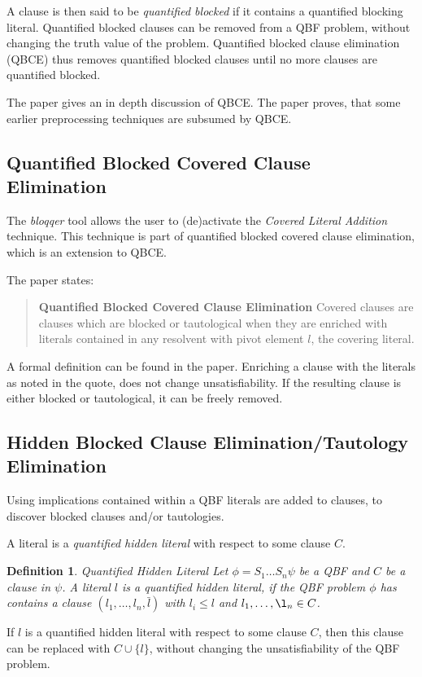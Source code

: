 \documentclass{scrartcl}
\newtheorem{definition}{Definition}
\begin{document}
A clause is then said to be \emph{quantified blocked} if it contains a
quantified blocking literal. Quantified blocked clauses can be removed from a
QBF problem, without changing the truth value of the problem. 
Quantified blocked clause elimination (QBCE) thus removes quantified blocked clauses
until no more clauses are quantified blocked. 

The paper gives an in depth discussion of QBCE. The paper proves, that some
earlier preprocessing techniques are subsumed by QBCE.

\subsection{Quantified Blocked Covered Clause Elimination}
The \emph{bloqqer} tool allows the user to (de)activate the \emph{Covered
Literal Addition} technique. This technique is part of quantified blocked
covered clause elimination, which is an extension to QBCE.

The paper states: 
\begin{quote}\textbf{Quantified Blocked Covered Clause Elimination}
Covered clauses are clauses which are blocked or tautological when they are
enriched with literals contained in any resolvent with pivot element $l$, the
covering literal.
\end{quote}
A formal definition can be found in the paper.
Enriching a clause with the literals as noted in the quote, does not change
unsatisfiability. If the resulting clause is either blocked or tautological, it
can be freely removed. 

\subsection{Hidden Blocked Clause Elimination/Tautology Elimination}

Using implications contained within a QBF literals are added to clauses, to
discover blocked clauses and/or tautologies.

A literal is a \emph{quantified hidden literal} with respect to some clause $C$.
\begin{definition}{Quantified Hidden Literal}
Let $\phi=S_1\dots S_n\psi$ be a QBF and $C$ be a clause in $\psi$. A literal
$l$ is a \emph{quantified hidden literal}, if the QBF problem $\phi$ has
contains a clause $(l_1,\dots,l_n,\bar{l})$ with $l_i\leq l$ and
$l_1,\dots,\l_n\in C$.
\end{definition}

If $l$ is a quantified hidden literal with respect to some clause $C$, then this
clause can be replaced with $C\cup\{l\}$, without changing the unsatisfiability
of the QBF problem.
\end{document}
